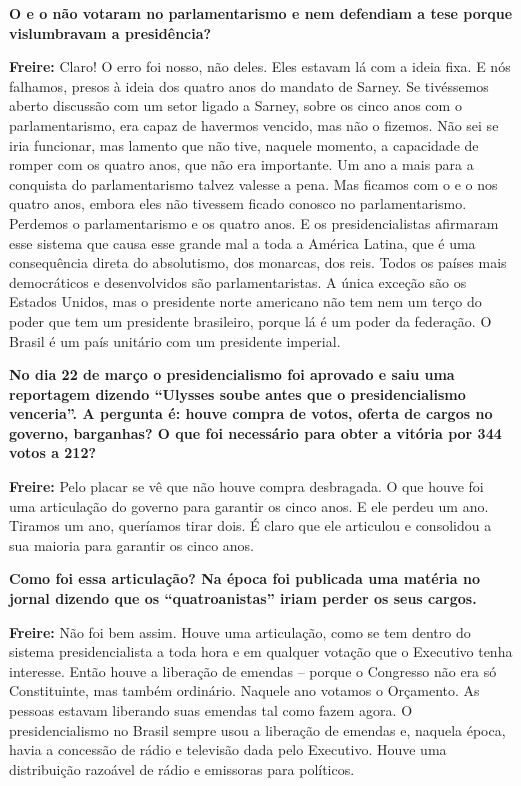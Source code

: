 \textbf{O  e o  não votaram no parlamentarismo e nem defendiam a
tese porque vislumbravam a presidência?}

\textbf{Freire:} Claro! O erro foi nosso, não deles. Eles estavam lá com
a ideia fixa. E nós falhamos, presos à ideia dos quatro anos do mandato
de Sarney. Se tivéssemos aberto discussão com um setor ligado a Sarney,
sobre os cinco anos com o parlamentarismo, era capaz de havermos
vencido, mas não o fizemos. Não sei se iria funcionar, mas lamento que
não tive, naquele momento, a capacidade de romper com os quatro anos,
que não era importante. Um ano a mais para a conquista do
parlamentarismo talvez valesse a pena. Mas ficamos com o  e o  nos
quatro anos, embora eles não tivessem ficado conosco no parlamentarismo.
Perdemos o parlamentarismo e os quatro anos. E os presidencialistas
afirmaram esse sistema que causa esse grande mal a toda a América
Latina, que é uma consequência direta do absolutismo, dos monarcas, dos
reis. Todos os países mais democráticos e desenvolvidos são
parlamentaristas. A única exceção são os Estados Unidos, mas o
presidente norte americano não tem nem um terço do poder que tem um
presidente brasileiro, porque lá é um poder da federação. O Brasil é um
país unitário com um presidente imperial.

\textbf{No dia 22 de março o presidencialismo foi aprovado e saiu uma
reportagem dizendo ``Ulysses soube antes que o presidencialismo
venceria''. A pergunta é: houve compra de votos, oferta de cargos no
governo, barganhas? O que foi necessário para obter a vitória por 344
votos a 212?}

\textbf{Freire:} Pelo placar se vê que não houve compra desbragada. O
que houve foi uma articulação do governo para garantir os cinco anos. E
ele perdeu um ano. Tiramos um ano, queríamos tirar dois. É claro que ele
articulou e consolidou a sua maioria para garantir os cinco anos.

\textbf{Como foi essa articulação? Na época foi publicada uma matéria no
jornal dizendo que os ``quatroanistas'' iriam perder os seus cargos.}

\textbf{Freire:} Não foi bem assim. Houve uma articulação, como se tem
dentro do sistema presidencialista a toda hora e em qualquer votação que
o Executivo tenha interesse. Então houve a liberação de emendas --
porque o Congresso não era só Constituinte, mas também ordinário.
Naquele ano votamos o Orçamento. As pessoas estavam liberando suas
emendas tal como fazem agora. O presidencialismo no Brasil sempre usou a
liberação de emendas e, naquela época, havia a concessão de rádio e
televisão dada pelo Executivo. Houve uma distribuição razoável de rádio
e emissoras para políticos.

